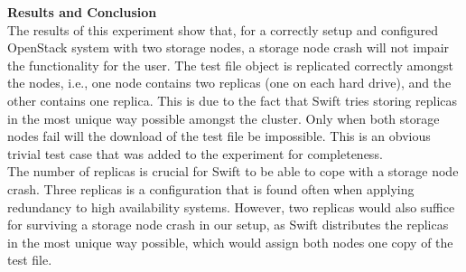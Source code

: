 \textbf{Results and Conclusion}\\
The results of this experiment show that, for a correctly setup and configured OpenStack system with two storage nodes, a storage node crash will not impair the functionality for the user. The test file object is replicated correctly amongst the nodes, i.e., one node contains two replicas (one on each hard drive), and the other contains one replica. This is due to the fact that Swift tries storing replicas in the most unique way possible amongst the cluster. Only when both storage nodes fail will the download of the test file be impossible. This is an obvious trivial test case that was added to the experiment for completeness.\\

The number of replicas is crucial for Swift to be able to cope with a storage node crash. Three replicas is a configuration that is found often when applying redundancy to high availability systems. However, two replicas would also suffice for surviving a storage node crash in our setup, as Swift distributes the replicas in the most unique way possible, which would assign both nodes one copy of the test file. 






